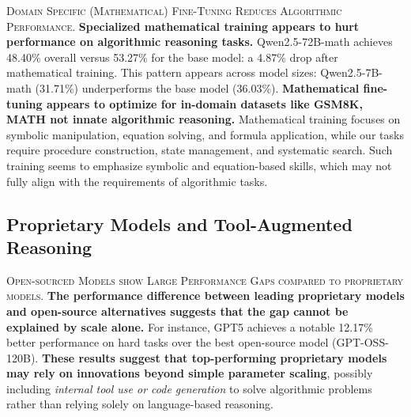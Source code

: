 \documentclass{article} %
\theoremstyle{plain}
\theoremstyle{definition}
\begin{document}
\textsc{Domain Specific (Mathematical) Fine-Tuning Reduces Algorithmic Performance.} \textbf{Specialized mathematical training appears to hurt performance on algorithmic reasoning tasks.} Qwen2.5-72B-math \citep{yang2024qwen25mathtechnicalreportmathematical} achieves 48.40\% overall versus 53.27\% for the base model: a 4.87\% drop after mathematical training. This pattern appears across model sizes: Qwen2.5-7B-math (31.71\%) underperforms the base model (36.03\%). \textbf{Mathematical fine-tuning appears to optimize for in-domain datasets like GSM8K, MATH not innate algorithmic reasoning.} Mathematical training focuses on symbolic manipulation, equation solving, and formula application, while our tasks require procedure construction, state management, and systematic search. Such training seems to emphasize symbolic and equation-based skills, which may not fully align with the requirements of algorithmic tasks.






\subsection{Proprietary Models and Tool-Augmented Reasoning}


\textsc{Open-sourced Models show Large Performance Gaps compared to proprietary models.} \textbf{The performance difference between leading proprietary models \citep{comanici2025gemini25pushingfrontier, openai2024gpt4technicalreport} and open-source alternatives suggests that the gap cannot be explained by scale alone.} For instance, GPT5 achieves a notable 12.17\% better performance on hard tasks over the best open-source model (GPT-OSS-120B). \textbf{These results suggest that top-performing proprietary models may rely on innovations beyond simple parameter scaling}, possibly including \textit{internal tool use or code generation} to solve algorithmic problems rather than relying solely on language-based reasoning.
\end{document}
